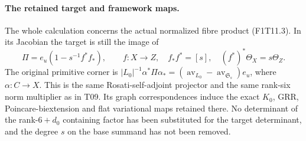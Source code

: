 \paragraph{The retained target and framework maps.}
The whole calculation concerns the actual normalized
fibre product (F1T11.3). In its Jacobian the target is
still the image of
\[
 \Pi=e_u(1-s^{-1}f^*f_*),\qquad f:X\to Z,
 \quad f_*f^*=[s],\quad (f^*)^*\Theta_X=s\Theta_Z .
 \tag{F1T11.11}
\]
The original primitive corner is
\(|L_0|^{-1}\alpha^*\Pi\alpha_*
 =(\operatorname{av}_{L_0}-\operatorname{av}_{\mathfrak S_s})e_u\),
where \(\alpha:C\to X\). This is the same Rosati-self-adjoint
projector and the same rank-six norm multiplier as in T09.
Its graph correspondences induce the exact \(K_0\), GRR,
Poincare-biextension and flat variational maps retained
there. No determinant of the rank-\(6+d_0\) containing
factor has been substituted for the target determinant,
and the degree \(s\) on the base summand has not been removed.
